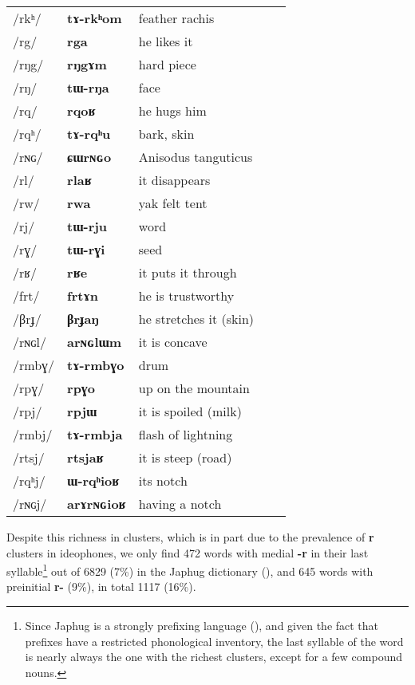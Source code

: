 \documentclass[oneside,a4paper,11pt]{article}
\newcommand{\ipa}[1]{{\phon\mbox{\textbf{#1}}}}
\newcommand{\deux}[1]{/#1/}
\newcommand{\trois}[1]{/#1/}
\newcommand{\tib}[1]{\cellcolor{lightgray}\textbf{#1}}
\begin{document}
\begin{table}[H]
\begin{tabular}{lllll}
 \deux{rkʰ}  	&	 \ipa{tɤ-rkʰom}  	&	 feather rachis 	\\
 \deux{rg}  	&	 \ipa{rga}  	&	 he likes it 	\\
 \deux{rŋg}  	&	 \ipa{rŋgɤm}  	&	hard piece  	\\
 \deux{rŋ}  	&	 \ipa{tɯ-rŋa}  	&	 face 	\\
 \deux{rq}  	&	 \ipa{rqoʁ}  	&	he hugs him  	\\
 \deux{rqʰ}  	&	 \ipa{tɤ-rqʰu}  	&	bark, skin 	\\
 \deux{rɴɢ}  	&	 \ipa{ɕɯrɴɢo}  	&	Anisodus tanguticus  	\\
 \deux{rl} 	& \ipa{rlaʁ} 	&it disappears \\
\deux{rw}\tib{} 	&\ipa{rwa} 	&yak felt tent	\\
\deux{rj} 	&\ipa{tɯ-rju} 	&word \\	
 \deux{rɣ}  	&  \ipa{tɯ-rɣi}  	&  seed	\\
\deux{rʁ}	&\ipa{rʁe}	& it puts it through\\	
	\trois{frt}  \tib{} &	\ipa{frtɤn}  &	he is trustworthy\\
	\trois{βrɟ}  \tib{} &	\ipa{βrɟaŋ}  &he stretches it (skin)	\\
	\trois{rɴɢl}  	& \ipa{arɴɢlɯm}  	&it is concave \\
 \trois{rmbɣ}  	&\ipa{tɤ-rmbɣo}  	&drum	\\
 \trois{rpɣ}  	&\ipa{rpɣo}  	&up on the mountain	\\
\trois{rpj} 		&\ipa{rpjɯ} 		&it is spoiled (milk)\\
\trois{rmbj} 		&\ipa{tɤ-rmbja} 		&flash of lightning\\
\trois{rtsj} 		&\ipa{rtsjaʁ} 		&it is steep (road)\\
\trois{rqʰj} 		&\ipa{ɯ-rqʰioʁ} 		&its notch\\
\trois{rɴɢj} 		&\ipa{arɤrɴɢioʁ} 		&having a notch\\
\bottomrule
\end{tabular}
\end{table}

Despite this richness in clusters, which is in part due to the prevalence of \ipa{r} clusters in ideophones, we only find 472 words with medial \ipa{-r} in their last syllable\footnote{Since Japhug is a strongly prefixing language (\citealt{jacques13harmonization}), and given the fact that prefixes have a restricted phonological inventory, the last syllable of the word is nearly always the one with the richest clusters, except for a few compound nouns.} out of 6829 (7\%) in the Japhug dictionary (\citealt{jacques15japhug}), and 645 words with preinitial \ipa{r-} (9\%), in total 1117 (16\%).
\end{document}

